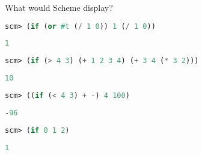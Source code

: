 \question What would Scheme display?

\begin{lstlisting}[language=Scheme]
scm> (if (or #t (/ 1 0)) 1 (/ 1 0))
\end{lstlisting}
\begin{solution}[0.15in]
\begin{lstlisting}[language=Scheme]
1
\end{lstlisting}
\end{solution}

\begin{lstlisting}[language=Scheme]
scm> (if (> 4 3) (+ 1 2 3 4) (+ 3 4 (* 3 2)))
\end{lstlisting}
\begin{solution}[0.15in]
\begin{lstlisting}[language=Scheme]
10
\end{lstlisting}
\end{solution}

\begin{lstlisting}[language=Scheme]
scm> ((if (< 4 3) + -) 4 100)
\end{lstlisting}
\begin{solution}[0.15in]
\begin{lstlisting}[language=Scheme]
-96
\end{lstlisting}
\end{solution}

\begin{lstlisting}[language=Scheme]
scm> (if 0 1 2)
\end{lstlisting}
\begin{solution}[0.15in]
\begin{lstlisting}[language=Scheme]
1
\end{lstlisting}
\end{solution}

